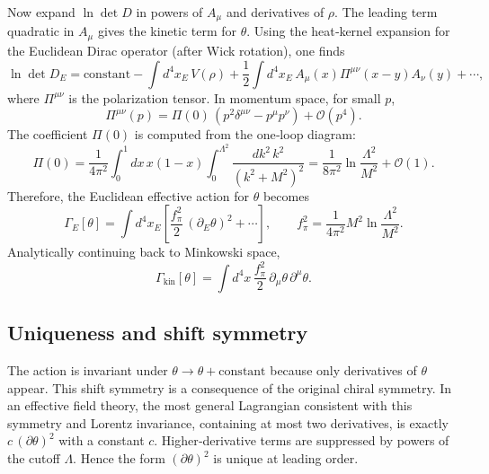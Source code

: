 \documentclass[11pt]{article}
\begin{document}
Now expand \(\ln\det D\) in powers of \(A_\mu\) and derivatives of \(\rho\). The leading term quadratic in \(A_\mu\) gives the kinetic term for \(\theta\). Using the heat‑kernel expansion for the Euclidean Dirac operator (after Wick rotation), one finds
\begin{equation}
\ln\det D_E = \text{constant} - \int d^4x_E\,V(\rho) + \frac{1}{2}\int d^4x_E\,A_\mu(x)\Pi^{\mu\nu}(x-y)A_\nu(y) + \cdots,
\end{equation}
where \(\Pi^{\mu\nu}\) is the polarization tensor. In momentum space, for small \(p\),
\begin{equation}
\Pi^{\mu\nu}(p) = \Pi(0)\,(p^2\delta^{\mu\nu} - p^\mu p^\nu) + \mathcal{O}(p^4).
\end{equation}
The coefficient \(\Pi(0)\) is computed from the one‑loop diagram:
\begin{equation}
\Pi(0) = \frac{1}{4\pi^2}\int_0^1\!dx\,x(1-x)\int_0^{\Lambda^2}\!\frac{dk^2\,k^2}{(k^2+M^2)^2}
= \frac{1}{8\pi^2}\ln\frac{\Lambda^2}{M^2} + \mathcal{O}(1).
\end{equation}
Therefore, the Euclidean effective action for \(\theta\) becomes
\begin{equation}
\Gamma_E[\theta] = \int d^4x_E\left[ \frac{f_\pi^2}{2}\,(\partial_E\theta)^2 + \cdots \right],
\qquad
f_\pi^2 = \frac{1}{4\pi^2}M^2\ln\frac{\Lambda^2}{M^2}.
\end{equation}
Analytically continuing back to Minkowski space,
\begin{equation}\label{eq:kinetic_theta}
\Gamma_{\text{kin}}[\theta] = \int d^4x\,\frac{f_\pi^2}{2}\,\partial_\mu\theta\,\partial^\mu\theta.
\end{equation}

\subsection*{Uniqueness and shift symmetry}
The action is invariant under \(\theta \to \theta + \text{constant}\) because only derivatives of \(\theta\) appear. This shift symmetry is a consequence of the original chiral symmetry. In an effective field theory, the most general Lagrangian consistent with this symmetry and Lorentz invariance, containing at most two derivatives, is exactly \(c\,(\partial\theta)^2\) with a constant \(c\). Higher‑derivative terms are suppressed by powers of the cutoff \(\Lambda\). Hence the form \((\partial\theta)^2\) is unique at leading order.
\end{document}
